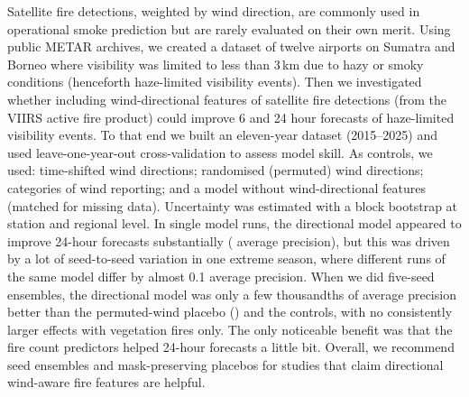 Satellite fire detections, weighted by wind direction, are commonly used in operational smoke
prediction but are rarely evaluated on their own merit. Using public METAR archives, we created a
dataset of twelve airports on Sumatra and Borneo where visibility was limited to less than 3\,km
due to hazy or smoky conditions (henceforth haze-limited visibility events). Then we investigated
whether including wind-directional features of satellite fire detections (from the VIIRS active
fire product) could improve 6 and 24 hour forecasts of haze-limited visibility events. To that end
we built an eleven-year dataset (2015--2025) and used leave-one-year-out cross-validation to assess
model skill. As controls, we used: time-shifted wind directions; randomised (permuted) wind
directions; categories of wind reporting; and a model without wind-directional features (matched
for missing data). Uncertainty was estimated with a block bootstrap at station and regional level.
In single model runs, the directional model appeared to improve 24-hour forecasts substantially
( average precision), but this was driven by a lot of
seed-to-seed variation in one extreme season, where different runs of the same model differ by
almost 0.1 average precision. When we did five-seed ensembles, the directional model was only a
few thousandths of average precision better than the permuted-wind placebo
() and the controls, with no consistently larger effects with vegetation
fires only. The only noticeable benefit was that the fire count predictors helped 24-hour
forecasts a little bit. Overall, we recommend seed ensembles and mask-preserving placebos for
studies that claim directional wind-aware fire features are helpful.
